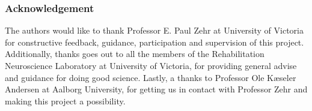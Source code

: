 \subsubsection*{Acknowledgement} 

The authors would like to thank Professor E. Paul Zehr at University of Victoria for constructive feedback, guidance, participation and supervision of this project. Additionally, thanks goes out to all the members of the Rehabilitation Neuroscience Laboratory at University of Victoria, for providing general advise and guidance for doing good science. Lastly, a thanks to Professor Ole Kæseler Andersen at Aalborg University, for getting us in contact with Professor Zehr and making this project a possibility. 